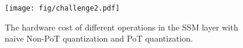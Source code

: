 \begin{figure}[!tb]
\centering
\texttt{[image: fig/challenge2.pdf]}
\vspace{-10pt}
\caption{The hardware cost of different operations in the SSM layer with naive Non-PoT quantization and PoT quantization.} 
\vspace{-10pt}
\label{fig:challenge2}
\end{figure}





